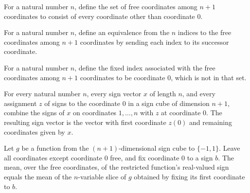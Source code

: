 \begin{definition}
\label{FABL.improvedFKNFreeCoordinates}
\leanok
For a natural number $n$, define the set of free coordinates among $n+1$ coordinates to
consist of every coordinate other than coordinate $0$.
\end{definition}

\begin{definition}
\label{FABL.improvedFKNTailIndexEquiv}
\leanok
{}
For a natural number $n$, define an equivalence from the $n$ indices to the free
coordinates among $n+1$ coordinates by sending each index to its successor coordinate.
\end{definition}

\begin{definition}
\label{FABL.improvedFKNHeadFixedIndex}
\leanok
{}
For a natural number $n$, define the fixed index associated with the free coordinates
among $n+1$ coordinates to be coordinate $0$, which is not in that set.
\end{definition}

\begin{theorem}
\label{FABL.combineSignCube_improvedFKNFreeCoordinates}
\leanok
{}
For every natural number $n$, every sign vector $x$ of length $n$, and every assignment
$z$ of signs to the coordinate $0$ in a sign cube of dimension $n+1$, combine the signs
of $x$ on coordinates $1,\ldots,n$ with $z$ at coordinate $0$. The resulting sign vector
is the vector with first coordinate $z(0)$ and remaining coordinates given by $x$.
\end{theorem}

\begin{theorem}
\label{FABL.mean_signRestriction_improvedFKNFreeCoordinates}
\leanok
{}
Let $g$ be a function from the $(n+1)$-dimensional sign cube to $\{-1,1\}$. Leave all
coordinates except coordinate $0$ free, and fix coordinate $0$ to a sign $b$. The mean,
over the free coordinates, of the restricted function's real-valued sign equals the mean
of the $n$-variable slice of $g$ obtained by fixing its first coordinate to $b$.
\end{theorem}

